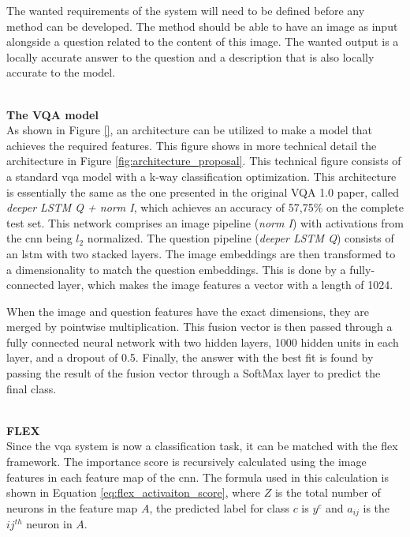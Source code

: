         
        
        
        The wanted requirements of the system will need to be defined before any method can be developed. 
        The method should be able to have an image as input alongside a question related to the content of this image. The wanted output is a locally accurate answer to the question and a description that is also locally accurate to the model. 
        
        \textbf{\\The VQA model\\} 
        As shown in Figure \ref{}, an architecture can be utilized to make a model that achieves the required features. This figure shows in more technical detail the architecture in Figure \ref{fig:architecture_proposal}. This technical figure consists of a standard \gls{vqa} model with a k-way classification optimization. This architecture is essentially the same as the one presented in the original VQA 1.0 paper, called \textit{deeper LSTM Q + norm I}, which achieves an accuracy of 57,75\% on the complete test set. 
        This network comprises an image pipeline (\textit{norm I}) with activations from the \gls{cnn} being $l_2$ normalized. The question pipeline (\textit{deeper LSTM Q}) consists of an \gls{lstm} with two stacked layers. 
        The image embeddings are then transformed to a dimensionality to match the question embeddings. This is done by a fully-connected layer, which makes the image features a vector with a length of 1024.

        When the image and question features have the exact dimensions, they are merged by pointwise multiplication. 
        This fusion vector is then passed through a fully connected neural network with two hidden layers, 1000 hidden units in each layer, and a dropout of 0.5.
        Finally, the answer with the best fit is found by passing the result of the  fusion vector through a SoftMax layer to predict the final class.
        
        
        
        
        

        \textbf{\\FLEX\\}
        Since the \gls{vqa} system is now a classification task, it can be matched with the \gls{flex} framework. 
        The importance score is recursively calculated using the image features in each feature map of the \gls{cnn}. The formula used in this calculation is shown in Equation \ref{eq:flex_activaiton_score}, where $Z$ is the total number of neurons in the feature map $A$, the predicted label for class $c$ is $y^c$ and $a_{ij}$ is the $ij^{th}$ neuron in $A$.

